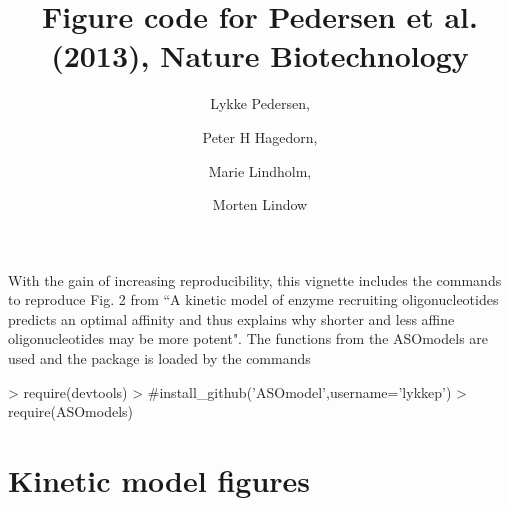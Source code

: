 \documentclass{article}
\title{Figure code for Pedersen et al. (2013), Nature Biotechnology}
\author{Lykke Pedersen, \and Peter H Hagedorn, \and Marie Lindholm, \and Morten Lindow}
\date{}
\begin{document}



\maketitle
With the gain of increasing reproducibility, this vignette includes the commands to reproduce Fig. 2 from ``A kinetic model of enzyme recruiting oligonucleotides predicts an optimal affinity and thus explains why shorter and less affine oligonucleotides may be more potent". The functions from the ASOmodels are used and the package is loaded by the commands

\begin{Schunk}
\begin{Sinput}
> require(devtools)
> #install_github('ASOmodel',username='lykkep')
> require(ASOmodels)
\end{Sinput}
\end{Schunk}

\section*{Kinetic model figures}
\end{document}

